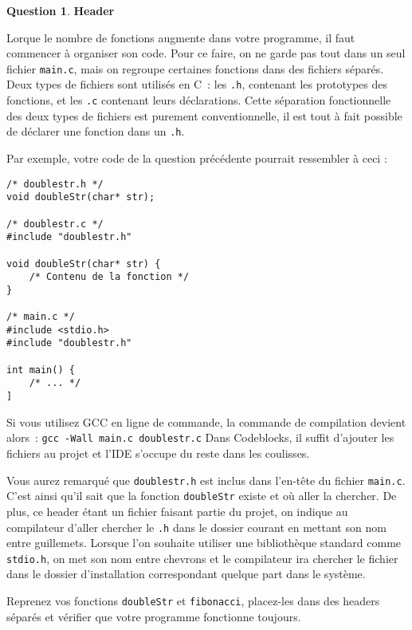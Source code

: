 \documentclass[11pt,a4paper,dvipsnames]{article}
\theoremstyle{definition}%
\newtheorem{Q}{Question}[] %
\begin{document}
\begin{Q} \textbf{Header}

Lorque le nombre de fonctions augmente dans votre programme, il faut commencer à organiser son code.
Pour ce faire, on ne garde pas tout dans un seul fichier \texttt{main.c}, mais on regroupe certaines fonctions dans des fichiers séparés.
Deux types de fichiers sont utilisés en C~: les \texttt{.h}, contenant les prototypes des fonctions, et les \texttt{.c} contenant leurs déclarations. Cette séparation fonctionnelle des deux types de fichiers est purement conventionnelle, il est tout à fait possible de déclarer une fonction dans un \texttt{.h}.

Par exemple, votre code de la question précédente pourrait ressembler à ceci :
\begin{verbatim}
/* doublestr.h */
void doubleStr(char* str);

/* doublestr.c */
#include "doublestr.h"

void doubleStr(char* str) {
	/* Contenu de la fonction */
}

/* main.c */
#include <stdio.h>
#include "doublestr.h"

int main() {
	/* ... */
]
\end{verbatim}

Si vous utilisez GCC en ligne de commande, la commande de compilation devient alors~: \texttt{gcc -Wall main.c doublestr.c}
Dans Codeblocks, il suffit d'ajouter les fichiers au projet et l'IDE s'occupe du reste dans les coulisses.

Vous aurez remarqué que \texttt{doublestr.h} est inclus dans l'en-tête du fichier \texttt{main.c}.
C'est ainsi qu'il sait que la fonction \texttt{doubleStr} existe et où aller la chercher.
De plus, ce header étant un fichier faisant partie du projet, on indique au compilateur d'aller chercher le \texttt{.h} dans le dossier courant en mettant son nom entre guillemets.
Lorsque l'on souhaite utiliser une bibliothèque standard comme \texttt{stdio.h}, on met son nom entre chevrons et le compilateur ira chercher le fichier dans le dossier d'installation correspondant quelque part dans le système.

Reprenez vos fonctions \texttt{doubleStr} et \texttt{fibonacci}, placez-les dans des headers séparés et vérifier que votre programme fonctionne toujours.
\end{Q}
\end{document}
